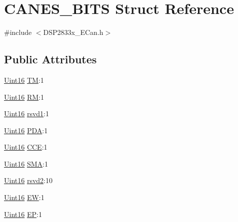 \hypertarget{struct_c_a_n_e_s___b_i_t_s}{}\section{C\+A\+N\+E\+S\+\_\+\+B\+I\+T\+S Struct Reference}
\label{struct_c_a_n_e_s___b_i_t_s}


{\ttfamily \#include $<$D\+S\+P2833x\+\_\+\+E\+Can.\+h$>$}

\subsection*{Public Attributes}
\begin{DoxyCompactItemize}
\item 
\hyperlink{_d_s_p2833x___device_8h_a59a9f6be4562c327cbfb4f7e8e18f08b}{Uint16} \hyperlink{struct_c_a_n_e_s___b_i_t_s_a7b204c60a228a2526e7cdd119225a8ea}{T\+M}\+:1
\item 
\hyperlink{_d_s_p2833x___device_8h_a59a9f6be4562c327cbfb4f7e8e18f08b}{Uint16} \hyperlink{struct_c_a_n_e_s___b_i_t_s_ac98c1d3127a338eb99222af0014797ed}{R\+M}\+:1
\item 
\hyperlink{_d_s_p2833x___device_8h_a59a9f6be4562c327cbfb4f7e8e18f08b}{Uint16} \hyperlink{struct_c_a_n_e_s___b_i_t_s_aedd01bed6a2ee0db7d08d557db3b42cc}{rsvd1}\+:1
\item 
\hyperlink{_d_s_p2833x___device_8h_a59a9f6be4562c327cbfb4f7e8e18f08b}{Uint16} \hyperlink{struct_c_a_n_e_s___b_i_t_s_a364c94f7b37d331ff7a815764949036d}{P\+D\+A}\+:1
\item 
\hyperlink{_d_s_p2833x___device_8h_a59a9f6be4562c327cbfb4f7e8e18f08b}{Uint16} \hyperlink{struct_c_a_n_e_s___b_i_t_s_aace941e1250e18ade11e7d45f5f7468e}{C\+C\+E}\+:1
\item 
\hyperlink{_d_s_p2833x___device_8h_a59a9f6be4562c327cbfb4f7e8e18f08b}{Uint16} \hyperlink{struct_c_a_n_e_s___b_i_t_s_acc8f171f6b1f39d29da1434c33feab77}{S\+M\+A}\+:1
\item 
\hyperlink{_d_s_p2833x___device_8h_a59a9f6be4562c327cbfb4f7e8e18f08b}{Uint16} \hyperlink{struct_c_a_n_e_s___b_i_t_s_a45317ce911b14f7d88d47e9fa8a9148e}{rsvd2}\+:10
\item 
\hyperlink{_d_s_p2833x___device_8h_a59a9f6be4562c327cbfb4f7e8e18f08b}{Uint16} \hyperlink{struct_c_a_n_e_s___b_i_t_s_a534679fa7e39667a891ced753663cc98}{E\+W}\+:1
\item 
\hyperlink{_d_s_p2833x___device_8h_a59a9f6be4562c327cbfb4f7e8e18f08b}{Uint16} \hyperlink{struct_c_a_n_e_s___b_i_t_s_afcf57c54f201945da35018961752cf4e}{E\+P}\+:1

\end{DoxyCompactItemize}
